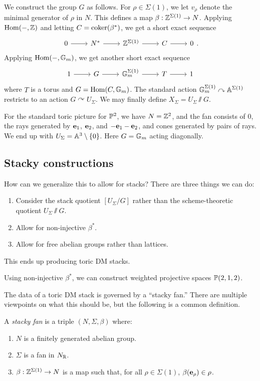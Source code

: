 \documentclass{amsart}
\begin{document}
We construct the group $G$ as follows.
For $\rho \in \Sigma(1)$, we let $v_\rho$ denote the minimal generator of $\rho$ in $N$.
This defines a map $\beta: \ZZ^{\Sigma(1)} \to N$.
Applying $\Hom(-, \ZZ)$ and letting $C = \coker(\beta^*)$, we get a short exact sequence
\[
	\SES{N^*}{\ZZ^{\Sigma(1)}}{C}.
\]
Applying $\Hom(-, \GG_m)$, we get another short exact sequence
\[
	\begin{tikzcd}
		1 \rar & G \rar & \GG_m^{\Sigma(1)} \rar & T \rar & 1
	\end{tikzcd}
\]
where $T$ is a torus and $G = \Hom(C, \GG_m)$.
The standard action $\GG_m^{\Sigma(1)} \curvearrowright \AA^{\Sigma(1)}$ restricts to an action $G \curvearrowright U_\Sigma$.
We may finally define $X_\Sigma = U_\Sigma \sslash G$.

\begin{ex}
	For the standard toric picture for $\PP^2$, we have $N = \ZZ^2$, and the fan consists of $0$, the rays generated by $\ebf_1$, $\ebf_2$, and $-\ebf_1 - \ebf_2$, and cones generated by pairs of rays.
	We end up with $U_\Sigma = \AA^3 \setminus \{0\}$.
	Here $G = \GG_m$ acting diagonally.
\end{ex}

\subsection{Stacky constructions}

How can we generalize this to allow for stacks?
There are three things we can do:
\begin{enumerate}
	\item Consider the stack quotient $[U_\Sigma / G]$ rather than the scheme-theoretic quotient $U_\Sigma \sslash G$.
	\item Allow for non-injective $\beta^*$.
	\item Allow for free abelian groups rather than lattices.
\end{enumerate}
This ends up producing toric DM stacks.

\begin{ex}
	Using non-injective $\beta^*$, we can construct weighted projective spaces $\PP(2,1,2)$.
\end{ex}

The data of a toric DM stack is governed by a ``stacky fan.''
There are multiple viewpoints on what this should be, but the following is a common definition.

\begin{dfn}
	A \emph{stacky fan} is a triple $(N, \Sigma, \beta)$ where:
	\begin{enumerate}
		\item $N$ is a finitely generated abelian group.
		\item $\Sigma$ is a fan in $N_\RR$.
		\item $\beta: \ZZ^{\Sigma(1)} \to N$ is a map such that, for all $\rho \in \Sigma(1)$, $\beta(\ebf_\rho) \in \rho$.
	\end{enumerate}
\end{dfn}
\end{document}
